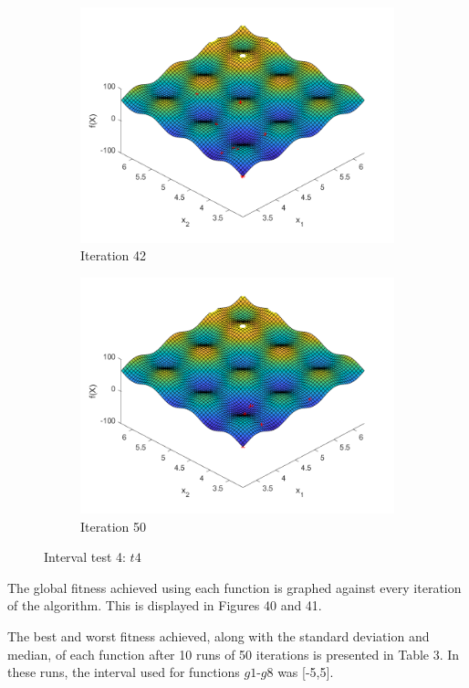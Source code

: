 \begin{figure}
\begin{subfigure}[b]{0.4\textwidth}
   \includegraphics[width=\textwidth]{img/smpl/rast2dshft/loa-iter-42}
   \caption{Iteration 42}
   \label{fig:i4-iter-6}
 \end{subfigure}
 \begin{subfigure}[b]{0.4\textwidth}
   \includegraphics[width=\textwidth]{img/smpl/rast2dshft/loa-iter-50}
   \caption{Iteration 50}
   \label{fig:i4-iter-7}
 \end{subfigure}
 \caption{Interval test 4: $t4$}
\end{figure}

\par The global fitness achieved using each function is graphed against every iteration of the algorithm. This is displayed in Figures 40 and 41.
\par
\par The best and worst fitness achieved, along with the standard deviation and median, of each function after 10 runs of 50 iterations is presented in Table 3. In these runs, the interval used for functions $g1$-$g8$ was [-5,5].
\par

